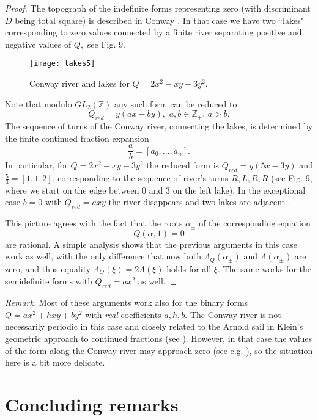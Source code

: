 \documentclass[11pt,reqno]{amsart}
\begin{document}
\begin{proof}
The topograph of the indefinite forms representing zero (with discriminant $D$ being total square) is described in Conway \cite{Conway}.
In that case we have two ``lakes" corresponding to zero values connected by a finite river separating positive and negative values of $Q,$ see Fig. 9.

\begin{figure}[h]
	\centering
	\texttt{[image: lakes5]} \label{fig:CL}
	\caption{Conway river and lakes for $Q=2x^2 - xy - 3y^2.$}
	\end{figure}

Note that modulo $GL_2(\mathbb Z)$ any such form can be reduced to
$$
Q_{red}=y(ax-by), \,\, a,b \in \mathbb Z_+, \, a>b.
$$
The sequence of turns of the Conway river, connecting the lakes, is determined by the finite continued fraction expansion
$$
\frac{a}{b}=[a_0,\dots,a_n].
$$
In particular, for $Q=2x^2 - xy - 3y^2$ the reduced form is $Q_{red}=y(5x-3y)$ and $\frac{5}{3}=[1,1,2]$, corresponding to the sequence of river's turns $R,L,R,R$ (see Fig. 9, where we start on the edge between 0 and 3 on the left lake).
In the exceptional case $b=0$ with $Q_{red}=axy$ the river disappears and two lakes are adjacent \cite{Conway}.

This picture agrees with the fact that the roots $\alpha_\pm$ of the corresponding equation
$$
Q(\alpha,1)=0
$$
are rational. A simple analysis shows that the previous arguments in this case work as well, with the only difference that now both
$\Lambda_Q(\alpha_\pm)$ and $\Lambda(\alpha_\pm)$ are zero, and thus equality $\Lambda_Q(\xi)=2\Lambda(\xi)$ holds for all $\xi$.
The same works for the semidefinite forms with $Q_{red}=ax^2$ as well.
\end{proof}

{\it Remark.} Most of these arguments work also for the binary forms $Q=ax^2+hxy+by^2$ with {\it real} coefficients $a,h,b$.
The Conway river is not necessarily periodic in this case and closely related to the Arnold sail in Klein's geometric approach to continued fractions \cite{Klein} (see \cite{SV1}).
However, in that case the values of the form along the Conway river may approach zero (see e.g. \cite{KW}), so the situation here is a bit more delicate.


\section{Concluding remarks}
\end{document}
